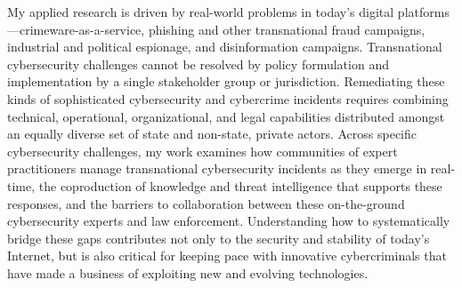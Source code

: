 \documentclass[11pt]{letter}
\begin{document}
\begin{letter}
My applied research is driven by real-world problems in today's digital platforms---crimeware-as-a-service, phishing and other transnational fraud campaigns, industrial and political espionage, and disinformation campaigns.
%
Transnational cybersecurity challenges cannot be resolved by policy formulation and implementation by a single stakeholder group or jurisdiction.
%
Remediating these kinds of sophisticated cybersecurity and cybercrime incidents requires combining technical, operational, organizational, and legal capabilities distributed amongst an equally diverse set of state and non-state, private actors.
%
Across specific cybersecurity challenges, my work examines how communities of expert practitioners manage transnational cybersecurity incidents as they emerge in real-time, the coproduction of knowledge and threat intelligence that supports these responses, and the barriers to collaboration between these on-the-ground cybersecurity experts and law enforcement.
%
Understanding how to systematically bridge these gaps contributes not only to the security and stability of today's Internet, but is also critical for keeping pace with innovative cybercriminals that have made a business of exploiting new and evolving technologies. 

%
%
%


\end{letter}
\end{document}
